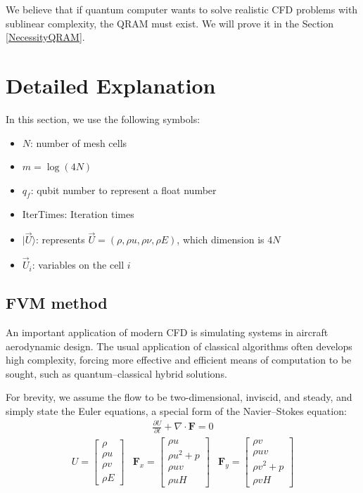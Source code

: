 \documentclass[%
 reprint,
 amsmath,amssymb,
pra,
]{revtex4-1}
\begin{document}
We believe that if quantum computer wants to solve realistic CFD problems with sublinear complexity, the QRAM must exist. We will prove it in the Section \ref{NecessityQRAM}.

\section{Detailed Explanation}\label{detail}
In this section, we use the following symbols:

\begin{itemize}
\item $N$: number of mesh cells
\item $m=\log(4N)$
\item $q_f$: qubit number to represent a float number
\item IterTimes: Iteration times
\item $|\vec{U}\rangle$: represents $\vec{U}=(\rho,\rho u, \rho\nu, \rho E)$, which dimension is $4N$
\item $\vec{U}_i$: variables on the cell $i$ 
\end{itemize}
\subsection{FVM method}\label{classicalFVM}

An important application of modern CFD is simulating systems in aircraft aerodynamic design. The usual application of classical algorithms often develops high complexity, forcing more effective and efficient means of computation to be sought, such as quantum--classical hybrid solutions.

For brevity, we assume the flow to be two-dimensional, inviscid, and steady, and simply state the Euler equations\cite{euler1757principes, hirsch2007numerical, anderson2010fundamentals}, a special form of the Navier--Stokes equation:
\begin{align}\label{eq:differential_equation}
\frac{\partial U}{\partial t} + \nabla \cdot \bm{F} = 0
\end{align}
\begin{equation}
\begin{array}{ccc}
U = \left[
\begin{array}{c}
\rho\\
\rho u\\
\rho v\\
\rho E
\end{array}
\right]
&
\bm{F}_x = \left[
\begin{array}{c}
\rho u\\
\rho u^2 + p\\
\rho u v\\
\rho u H
\end{array}
\right]
&
\bm{F}_y = \left[
\begin{array}{c}
\rho v\\
\rho u v\\
\rho v^2 + p\\
\rho v H
\end{array}
\right]
\end{array}
\end{equation}
\end{document}
